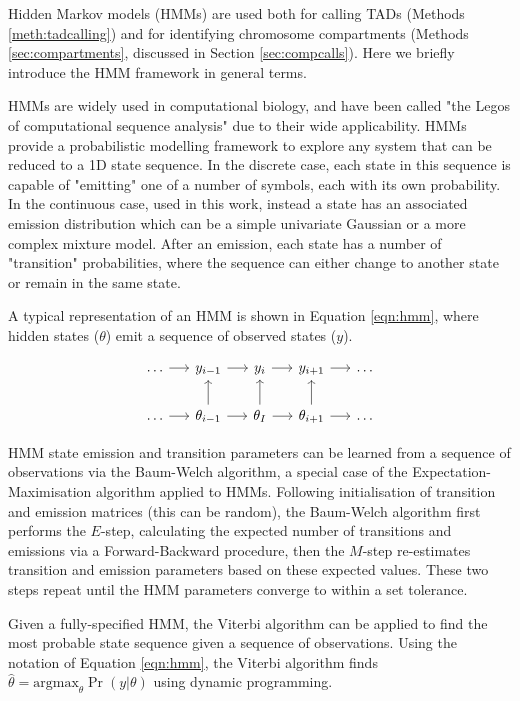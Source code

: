 \documentclass[a4paper,11pt,oneside]{book}
\begin{document}
Hidden Markov models (HMMs) are used both for calling TADs (Methods \ref{meth:tadcalling}) and for identifying chromosome compartments (Methods \ref{sec:compartments}, discussed in Section \ref{sec:compcalls}). Here we briefly introduce the HMM framework in general terms.

HMMs are widely used in computational biology, and have been called "the Legos of computational sequence analysis"\cite{Eddy2004} due to their wide applicability. HMMs provide a probabilistic modelling framework to explore any system that can be reduced to a 1D state sequence.\cite{Eddy1996, Rabiner1989} In the discrete case, each state in this sequence is capable of "emitting" one of a number of symbols, each with its own probability. In the continuous case, used in this work, instead a state has an associated emission distribution which can be a simple univariate Gaussian or a more complex mixture model. After an emission, each state has a number of "transition" probabilities, where the sequence can either change to another state or remain in the same state.

A typical representation of an HMM is shown in Equation \ref{eqn:hmm}, where hidden states ($\theta$) emit a sequence of observed states ($y$).\cite{Volg2005}

\begin{equation}\label{eqn:hmm}
\begin{tikzcd}[column sep=1.2pc]
\ldots \arrow{r} & y_{i-1} \arrow{r} & y_i \arrow{r} & y_{i+1} \arrow{r} & \ldots\\
\ldots \arrow{r} & \theta_{i-1} \arrow{r} \arrow{u} &
\theta_I \arrow{u} \arrow{r} & \theta_{i+1} \arrow{u} \arrow{r} & \ldots
\end{tikzcd}
\end{equation}

HMM state emission and transition parameters can be learned from a sequence of observations via the Baum-Welch algorithm,\cite{Baum1970} a special case of the Expectation-Maximisation algorithm applied to HMMs. Following initialisation of transition and emission matrices (this can be random), the Baum-Welch algorithm first performs the $E$-step, calculating the expected number of transitions and emissions via a Forward-Backward procedure, then the $M$-step re-estimates transition and emission parameters based on these expected values. These two steps repeat until the HMM parameters converge to within a set tolerance.

Given a fully-specified HMM, the Viterbi algorithm can be applied to find the most probable state sequence given a sequence of observations.\cite{ryan1993viterbi} Using the notation of Equation \ref{eqn:hmm}, the Viterbi algorithm finds $\hat{\theta} = \mathrm{argmax}_\theta \Pr( y \vert \theta)$ using dynamic programming.\cite{Volg2005}
\end{document}
